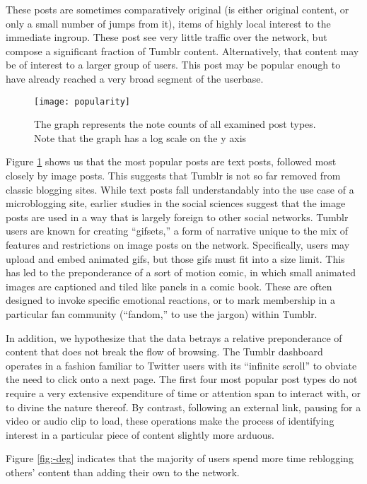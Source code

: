 These posts are sometimes comparatively original 
(is either original content, or only a small number of jumps from it),
items of highly local interest to the immediate ingroup. These post see
very little traffic over the network, but compose a significant 
fraction of Tumblr content.  Alternatively, that content may be of 
interest to a larger group of users.  This post may be popular enough 
to have already reached a very broad segment of the userbase.


\begin{figure}[bht]
\centering
 \texttt{[image: popularity]}
  \caption{The graph represents the note counts of all examined post types.  Note that the graph has a log scale on the y axis}
  \label{fig:-pop}
\end{figure}


Figure \ref{fig:-pop} shows us that the most popular posts are text 
posts, followed most closely by image posts.  This suggests that Tumblr 
is not so far removed from classic blogging sites.  While text posts 
fall understandably into the use case of a microblogging site, earlier 
studies in the social 
sciences\cite{thomas2012revisioning,hillman2014tumblr} suggest that 
the image posts are used in a way that is largely foreign to other social 
networks.  Tumblr users are known for creating ``gifsets,'' a form of 
narrative unique to the mix of features and restrictions on image posts 
on the network.  Specifically, users may upload and embed animated gifs, 
but those gifs must fit into a size limit.  This has led to the 
preponderance of a sort of motion comic, in which small animated images 
are captioned and tiled like panels in a comic book.  These are often 
designed to invoke specific emotional reactions, or to mark membership 
in a particular fan community (``fandom,'' to use the jargon) within 
Tumblr.  


In addition, we hypothesize that the data betrays a relative 
preponderance of content that does not break the flow of browsing.  
The Tumblr dashboard operates in a fashion familiar to Twitter users 
with its ``infinite scroll'' to obviate the need to click onto a next 
page.  The first four most popular post types do not require a very 
extensive expenditure of time or attention span to interact with, or 
to divine the nature thereof.  By contrast, following an external link, 
pausing for a video or audio clip to load, these operations make the 
process of identifying interest in a particular piece of content 
slightly more arduous.





Figure \ref{fig:-deg} indicates that the majority of users spend more 
time reblogging others' content than adding their own to the network.






